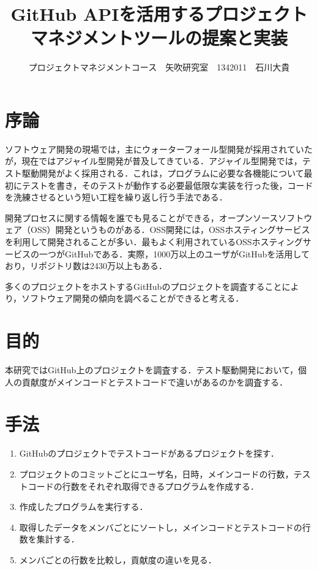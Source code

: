 \documentclass[uplatex,twocolumn,dvipdfmx]{jsarticle}
\title{\vspace{-5mm}\fontsize{14pt}{0pt}\selectfont GitHub APIを活用するプロジェクトマネジメントツールの提案と実装}
\author{\normalsize プロジェクトマネジメントコース　矢吹研究室　1342011　石川大貴}
\date{}
\begin{document}
\fontsize{10.5pt}{\baselineskip}\selectfont
\maketitle





\section{序論}

ソフトウェア開発の現場では，主にウォーターフォール型開発が採用されていたが，現在ではアジャイル型開発が普及してきている．アジャイル型開発では，テスト駆動開発がよく採用される．これは，プログラムに必要な各機能について最初にテストを書き，そのテストが動作する必要最低限な実装を行った後，コードを洗練させるという短い工程を繰り返し行う手法である\cite{shimizu2012}．

開発プロセスに関する情報を誰でも見ることができる，オープンソースソフトウェア（OSS）開発というものがある．OSS開発には，OSSホスティングサービスを利用して開発されることが多い．最もよく利用されているOSSホスティングサービスの一つがGitHubである．実際，1000万以上のユーザがGitHubを活用しており，リポジトリ数は2430万以上もある\cite{github}．

多くのプロジェクトをホストするGitHubのプロジェクトを調査することにより，ソフトウェア開発の傾向を調べることができると考える．


\section{目的}

本研究ではGitHub上のプロジェクトを調査する．テスト駆動開発において，個人の貢献度がメインコードとテストコードで違いがあるのかを調査する．


\section{手法}

\begin{enumerate}
\item GitHubのプロジェクトでテストコードがあるプロジェクトを探す．
\item プロジェクトのコミットごとにユーザ名，日時，メインコードの行数，テストコードの行数をそれぞれ取得できるプログラムを作成する．
\item 作成したプログラムを実行する．
\item 取得したデータをメンバごとにソートし，メインコードとテストコードの行数を集計する．
\item メンバごとの行数を比較し，貢献度の違いを見る．
\end{enumerate}
\end{document}
